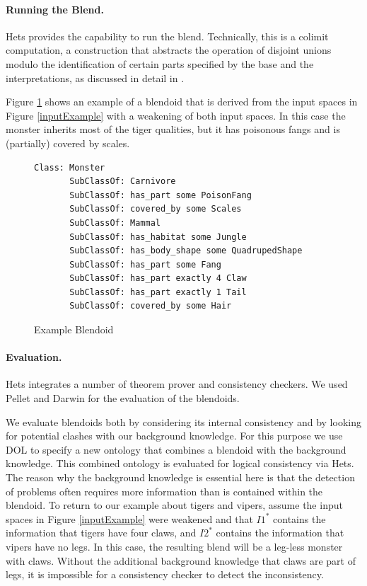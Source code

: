 \documentclass{ecai2012}
\begin{document}
\paragraph{Running the Blend.}
 Hets provides the capability to run the blend. Technically, this is a colimit computation,  a construction that abstracts the operation of disjoint unions modulo the identification of certain parts specified by the base and the interpretations, as discussed in detail in  \cite{Goguen03semioticmorphisms,hyper2010,blendingc3gi12}.

Figure \ref{exampleBlendoid} shows an example of a blendoid that is derived from the input spaces in Figure \ref{inputExample} with a weakening of both input spaces. In this case the monster inherits most of the tiger qualities, but it has poisonous fangs and  is (partially) covered by scales. 
 \begin{figure}[htbp]
\begin{lstlisting}[basicstyle=\ttfamily\scriptsize,language=dolText,morekeywords={props,excluding,ObjectProperty,Class,DisjointUnionOf,SubClassOf,Characteristics,Transitive,Asymmetric,SubPropertyOf,DisjointClasses,EquivalentTo,Asymmetric,inverse,only,forall,iff,if,or,exists,bridge,distributed},escapechar=@,mathescape,alsolanguage=owl2Manchester] 
Class: Monster
       SubClassOf: Carnivore
       SubClassOf: has_part some PoisonFang
       SubClassOf: covered_by some Scales
       SubClassOf: Mammal
       SubClassOf: has_habitat some Jungle
       SubClassOf: has_body_shape some QuadrupedShape
       SubClassOf: has_part some Fang
       SubClassOf: has_part exactly 4 Claw
       SubClassOf: has_part exactly 1 Tail
       SubClassOf: covered_by some Hair 
\end{lstlisting}
\caption{Example Blendoid}
\label{exampleBlendoid}
\end{figure}
\vspace{-2em}
  
\paragraph{Evaluation.}  \label{eval}
 Hets integrates a number of theorem prover and consistency checkers. 
 We used Pellet and Darwin for the evaluation of the blendoids. 
 
 
We evaluate blendoids both by considering its internal consistency and 
by looking for potential clashes with our background knowledge. For this purpose 
we use DOL to specify a new ontology that combines a blendoid with the background knowledge. 
This combined ontology is evaluated for logical consistency via Hets.  
The reason why the background knowledge is essential here is that   the detection of problems 
often requires more information than is contained within the blendoid.
 To return to our example about tigers and vipers, assume  
the input spaces in Figure \ref{inputExample} were weakened and that 
 $I1^*$ 
 contains the information that tigers have four claws,  and $I2^*$ contains
  the information that vipers have no legs. In this case, the resulting
   blend will be a leg-less monster with claws. Without the additional background 
   knowledge that claws are part of legs, it is impossible for a consistency checker to detect the inconsistency.  
\end{document}

